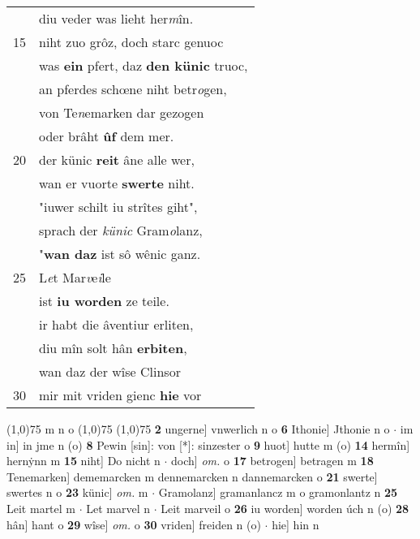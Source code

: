 \documentclass[8pt,a4paper,notitlepage]{article}
\begin{document}
\begin{table}[ht]
\begin{minipage}[t]{0.5\linewidth}
\begin{tabular}{rl}
 & diu veder was lieht her\textit{m}în.\\ 
15 & niht zuo grôz, doch starc genuoc\\ 
 & was \textbf{ein} pfert, daz \textbf{den künic} truoc,\\ 
 & an pferdes schœne niht betr\textit{o}gen,\\ 
 & von Te\textit{n}emarken dar gezogen\\ 
 & oder brâht \textbf{ûf} dem mer.\\ 
20 & der künic \textbf{reit} âne alle wer,\\ 
 & wan er vuorte \textbf{swerte} niht.\\ 
 & "iuwer schilt iu strîtes giht",\\ 
 & sprach der \textit{künic} Gram\textit{o}lanz,\\ 
 & "\textbf{wan daz} ist sô wênic ganz.\\ 
25 & L\textit{e}t Mar\textit{v}e\textit{i}le\\ 
 & ist \textbf{iu worden} ze teile.\\ 
 & ir habt die âventiur erliten,\\ 
 & diu mîn solt hân \textbf{erbiten},\\ 
 & wan daz der wîse Clinsor\\ 
30 & mir mit vriden gienc \textbf{hie} vor\\ 
\end{tabular}
\scriptsize
\line(1,0){75} \newline
m n o \newline
\line(1,0){75} \newline
\newline
\line(1,0){75} \newline
\textbf{2} ungerne] vnwerlich n o \textbf{6} Ithonie] Jthonie n o  $\cdot$ im in] in jme n (o) \textbf{8} Pewin [sin]: von [*]: sinzester o \textbf{9} huot] hutte m (o) \textbf{14} hermîn] hernẏnn m \textbf{15} niht] Do nicht n  $\cdot$ doch] \textit{om.} o \textbf{17} betrogen] betragen m \textbf{18} Tenemarken] dememarcken m dennemarcken n dannemarcken o \textbf{21} swerte] swertes n o \textbf{23} künic] \textit{om.} m  $\cdot$ Gramolanz] gramanlancz m o gramonlantz n \textbf{25} Leit martel m  $\cdot$ Let marvel n  $\cdot$ Leit marveil o \textbf{26} iu worden] worden úch n (o) \textbf{28} hân] hant o \textbf{29} wîse] \textit{om.} o \textbf{30} vriden] freiden n (o)  $\cdot$ hie] hin n \newline
\end{minipage}
\end{table}
\end{document}
